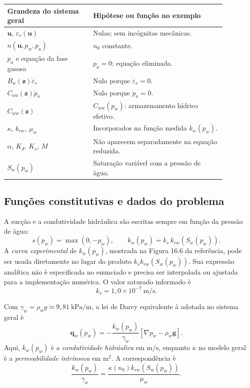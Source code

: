 \documentclass[11pt,a4paper]{article}
\begin{document}
\begin{center}
\begin{tabular}{p{0.35\linewidth}p{0.54\linewidth}}
\toprule
Grandeza do sistema geral & Hip\'otese ou fun\c{c}\~ao no exemplo \\
\midrule
$\mathbf u$, $\varepsilon_v(\mathbf u)$ & Nulas; sem inc\'ognitas mec\^anicas.\\
$n(\mathbf u,p_w,p_a)$ & $n_0$ constante.\\
$p_a$ e equa\c{c}\~ao da fase gasosa & $p_a=0$; equa\c{c}\~ao eliminada.\\
$B_w(\mathbf z)\dot\varepsilon_v$ & Nulo porque $\dot\varepsilon_v=0$.\\
$C_{wa}(\mathbf z)\dot p_a$ & Nulo porque $\dot p_a=0$.\\
$C_{ww}(\mathbf z)$ & $C_{ww}(p_w)$: armazenamento h\'idrico efetivo.\\
$\kappa$, $k_{rw}$, $\mu_w$ & Incorporados na fun\c{c}\~ao medida $k_w(p_w)$.\\
$\alpha$, $K_d$, $K_s$, $M$ & N\~ao aparecem separadamente na equa\c{c}\~ao reduzida.\\
$S_w(p_w)$ & Satura\c{c}\~ao vari\'avel com a press\~ao de \`agua.\\
\bottomrule
\end{tabular}
\end{center}

\subsection{Fun\c{c}\~oes constitutivas e dados do problema}

A suc\c{c}\~ao e a condutividade hidr\'aulica s\~ao escritas sempre
em fun\c{c}\~ao da press\~ao de \`agua:
\begin{equation*}
\boxed{s(p_w)=\max(0,-p_w),\qquad
k_w(p_w)=k_s\,k_{rw}(S_w(p_w)).}
\end{equation*}
A \emph{curva experimental} de $k_w(p_w)$, mostrada na
Figura 16.6 da refer\^encia, pode ser usada diretamente no lugar
do produto $k_s k_{rw}(S_w(p_w))$. Sua express\~ao anal\'itica
n\~ao \`e especificada no enunciado e precisa ser interpolada ou ajustada
para a implementa\c{c}\~ao num\'erica. O valor saturado informado \`e
\begin{equation*}
\boxed{k_s=1{,}0\times10^{-7}\ \mathrm{m/s}.}
\end{equation*}

Com $\gamma_w=\rho_w g\simeq9{,}81\ \mathrm{kPa/m}$,
a lei de Darcy equivalente \`a adotada no sistema geral \`e
\begin{equation*}
\boxed{\mathbf q_w(p_w)=
-\frac{k_w(p_w)}{\gamma_w}
\left[\nabla p_w-\rho_w\mathbf g\right].}
\end{equation*}
Aqui, $k_w(p_w)$ \`e a \emph{condutividade hidr\'aulica} em
$\mathrm{m/s}$, enquanto $\kappa$ no modelo geral \`e a
\emph{permeabilidade intr\'inseca} em $\mathrm{m^2}$. A correspond\^encia \`e
\begin{equation*}
\boxed{\frac{k_w(p_w)}{\gamma_w}
=\frac{\kappa(n_0)k_{rw}(S_w(p_w))}{\mu_w}.}
\end{equation*}
\end{document}
